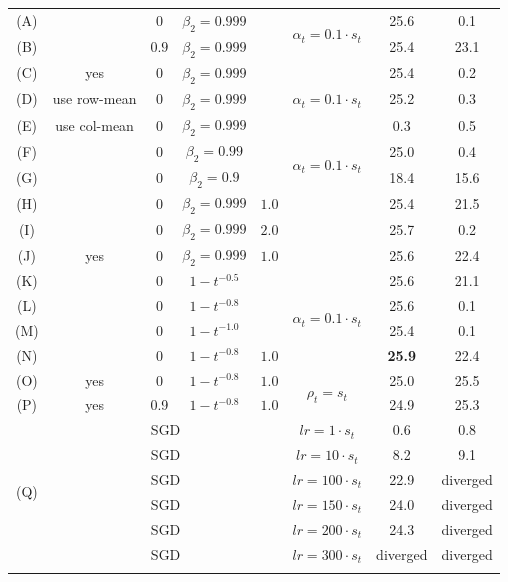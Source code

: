 \documentclass{article}
\begin{document}
\begin{table}[t]
\begin{center}
{\begin{tabular}{cccccc|cc}
(A)&   & 0   & $\beta_2=0.999$ & & \multirow{2}{*}{$\alpha_t=0.1 \cdot s_t$}  & 25.6& 0.1 \\
(B)&  & $0.9$ & $\beta_2=0.999$        & & & 25.4 & 23.1 \\
\hline
(C)& yes             & 0              & $\beta_2=0.999$ &  &  \multirow{3}{*}{$\alpha_t=0.1 \cdot s_t$} & 25.4 & 0.2 \\
(D)& use row-mean    & 0              & $\beta_2=0.999$ & & & 25.2 &  0.3 \\
(E)& use col-mean & 0              & $\beta_2=0.999$ & & & 0.3 & 0.5 \\
\hline
(F) &  & 0     & $\beta_2=0.99$   &  & \multirow{2}{*}{$\alpha_t=0.1 \cdot s_t$} & 25.0 & 0.4 \\
(G)&                & 0             & $\beta_2=0.9$  & & & 18.4 & 15.6 \\
\hline
(H)& & 0              & $\beta_2=0.999$ & $1.0$ & & 25.4 & 21.5 \\
(I)&                & 0              & $\beta_2=0.999$ & $2.0$ & & 25.7 & 0.2 \\
(J)& yes            & 0              & $\beta_2=0.999$ & $1.0$ & & 25.6 & 22.4 \\
\hline
(K)&             & 0              & $1-t^{-0.5}$ &  &\multirow{4}{*}{$\alpha_t=0.1 \cdot s_t$}  & 25.6 & 21.1 \\
(L)&             & 0              & $1-t^{-0.8}$ &  & & 25.6 & 0.1 \\
(M)&             & 0              & $1-t^{-1.0}$ &  & & 25.4 & 0.1 \\
(N)&             & 0              & $1-t^{-0.8}$ & $1.0$ & & \textbf{25.9} & 22.4 \\
\hline
(O)&yes & 0 & $1-t^{-0.8}$ & $1.0$ & \multirow{2}{*}{$\rho_t=s_t$} & 25.0 & 25.5 \\
(P)&yes & 0.9 & $1-t^{-0.8}$ & $1.0$ & & 24.9 & 25.3 \\
\hline
\multirow{6}{*}{(Q)} & \multicolumn{4}{c}{SGD} & $lr=1 \cdot s_t$  & 0.6 & 0.8\\
& \multicolumn{4}{c}{SGD} &$lr=10 \cdot s_t$ & 8.2 & 9.1\\
& \multicolumn{4}{c}{SGD} &$lr=100 \cdot s_t$ & 22.9 & diverged \\
& \multicolumn{4}{c}{SGD} &$lr=150 \cdot s_t$ & 24.0 & diverged \\
& \multicolumn{4}{c}{SGD} &$lr=200 \cdot s_t$ & 24.3 & diverged \\
& \multicolumn{4}{c}{SGD} &$lr=300 \cdot s_t$ & diverged & diverged\\
&\end{tabular}
\vspace{0.1in}
}
\end{center}
\end{table}
\end{document}
